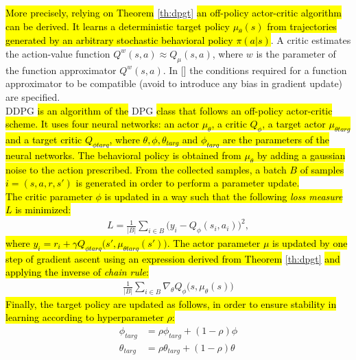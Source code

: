 \newline
\hl{More precisely, relying on Theorem} \ref{th:dpgt} \hl{an off-policy actor-critic algorithm can be derived. It learns a deterministic target policy $\mu_{\theta}(s)$ from trajectories generated by an arbitrary stochastic behavioral policy $\pi(a|s)$}. A critic estimates the action-value function $Q^w(s,a) \approx Q_{\mu}(s,a)$, where $w$ is the parameter of the function approximator $Q^w(s,a)$. In [\cite{article}] the conditions required for a function approximator to be compatible (\ie avoid to introduce any bias in gradient update) are specified.\\
\newline
\acf{DDPG} \hl{is an algorithm of the} \ac{DPG} \hl{class that follows an off-policy actor-critic scheme. It uses four neural networks: an actor $\mu_{\theta}$, a critic $Q_{\phi}$, a target actor $\mu_{\theta targ}$ and a target critic $Q_{\phi targ}$, where $\theta, \phi, \theta_{targ}$ and $\phi_{targ}$ are the parameters of the neural networks. The behavioral policy is obtained from $\mu_{\theta}$ by adding a gaussian noise to the action prescribed. From the collected samples, a batch $B$ of samples $i = (s,a,r,s')$ is generated in order to perform a parameter update.}\\
\newline
\hl{The critic parameter $\phi$ is updated in a way such that the following \emph{loss measure} $L$ is minimized:}
\begin{align}
	L = \frac{1}{|B|} \sum_{i \in B}\Big(y_i - Q_{\phi}(s_i, a_i) \Big)^2,
\end{align}
\hl{where $y_i = r_i + \gamma Q_{\phi targ}\Big(s', \mu_{\theta targ}(s')\Big)$. The actor parameter $\mu$ is updated by one step of gradient ascent using an expression derived from Theorem} \ref{th:dpgt} \hl{and applying the inverse of \emph{chain rule}:}
\begin{align}
	\frac{1}{|B|}\sum_{i \in B}\nabla_{\theta}Q_{\phi}\Big(s, \mu_{\theta}(s)\Big)
\end{align}
\hl{Finally, the target policy are updated as follows, in order to ensure stability in learning according to hyperparameter $\rho$:}
\begin{align}
	\phi_{targ} &= \rho \phi_{targ} + (1 - \rho) \phi\\
	\theta_{targ} &= \rho \theta_{targ} + (1 - \rho) \theta
\end{align}


